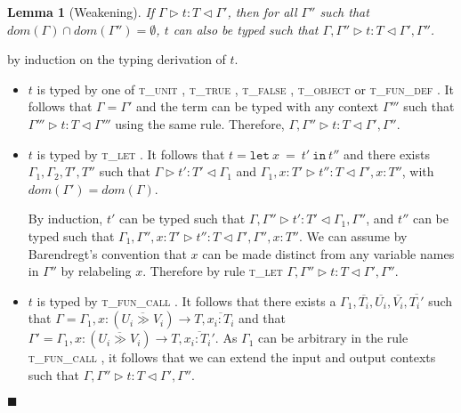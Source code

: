 \documentclass[preprint]{sigplanconf}
\newtheorem{lem}{Lemma}
\newcommand{\tunit}{\textsc{t\_unit} }
\newcommand{\ttrue}{\textsc{t\_true} }
\newcommand{\tfalse}{\textsc{t\_false} }
\newcommand{\tobj}{\textsc{t\_object} }
\newcommand{\tfundef}{\textsc{t\_fun\_def} }
\newcommand{\tlet}{\textsc{t\_let} }
\newcommand{\tfunc}{\textsc{t\_fun\_call} }
\newcommand{\typerule}[4]{#1 \triangleright #2 : #3 \triangleleft #4}
\newcommand{\lett}[3]{\mathtt{let}\:#1\:\mathtt{=}\:#2\:\mathtt{in}\:#3}
\newcommand{\qed}{$\blacksquare$}
\newenvironment{proof}{\vspace{1ex}\noindent{\bf Proof}\hspace{0.5em}}
  {\hfill\qed\vspace{1ex}}
\begin{document}


\begin{lem}[Weakening]
\label{lem:weakening}
If $\typerule{\Gamma}{t}{T}{\Gamma'}$,
then for all $\Gamma''$ such that $dom(\Gamma) \cap dom(\Gamma'') = \emptyset$,
$t$ can also be typed such that
$\typerule{\Gamma, \Gamma''}{t}{T}{\Gamma', \Gamma''}$.
\end{lem}
\begin{proof}
by induction on the typing derivation of $t$.

\begin{itemize}
\item $t$ is typed by one of \tunit, \ttrue, \tfalse, \tobj or \tfundef.
It follows that $\Gamma = \Gamma'$ and the term can be typed with any
context $\Gamma'''$ such that $\typerule{\Gamma'''}{t}{T}{\Gamma'''}$
using the same rule. 
Therefore, $\typerule{\Gamma, \Gamma''}{t}{T}{\Gamma', \Gamma''}$.

\item $t$ is typed by \tlet. It follows that $t = \lett{x}{t'}{t''}$ and
there exists $\Gamma_1, \Gamma_2, T', T''$ such that
$\typerule{\Gamma}{t'}{T'}{\Gamma_1}$ and
$\typerule{\Gamma_1, x : T'}{t''}{T}{\Gamma', x : T''}$,
with $dom(\Gamma') = dom(\Gamma)$.

By induction, $t'$ can be typed such
that $\typerule{\Gamma,\Gamma''}{t'}{T'}{\Gamma_1,\Gamma''}$,
and $t''$ can be typed such that
$\typerule{\Gamma_1, \Gamma'', x : T'}{t''}{T}{\Gamma', \Gamma'', x : T''}$.
We can assume by Barendregt's convention that $x$ can be made distinct from
any variable names in $\Gamma''$ by relabeling $x$.
Therefore by rule \tlet
$\typerule{\Gamma, \Gamma''}{t}{T}{\Gamma', \Gamma''}$.

\item $t$ is typed by \tfunc. It follows that
there exists a $\Gamma_1, \overline{T_i}, \overline{U_i}, \overline{V_i}, \overline{T_i'}$ 
such that 
$\Gamma = \Gamma_1, x : (\overline{U_i \gg V_i}) \rightarrow T, \overline{x_i : T_i}$
and that
$\Gamma' = \Gamma_1, x : (\overline{U_i \gg V_i}) \rightarrow T, \overline{x_i : T_i'}$.
As $\Gamma_1$ can be arbitrary in the rule \tfunc, it follows that we
can extend the input and output contexts such that
$\typerule{\Gamma, \Gamma''}{t}{T}{\Gamma', \Gamma''}$.


\end{itemize}
\end{proof}
\end{document}

